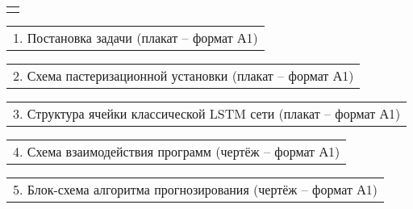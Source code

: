 \documentclass[12pt, А4, twoside]{article}
\begin{document}
\begin{FlushLeft}
    \begin{tabular}{p{17.25cm}}
        \vspace{0pt} \hline \\
    \end{tabular}

    \vspace{-0.1 cm}

    \begin{tabular}{p{17.25cm}}
        \hspace{0.3cm} \textsf{1. Постановка задачи (плакат {--} формат А1)} \vspace{0pt} \hline  \\
    \end{tabular}

    \vspace{-0.1 cm}

    \begin{tabular}{p{17.25cm}}
        \hspace{0.3cm} \textsf{2. Схема пастеризационной установки (плакат {--} формат А1)} \vspace{0pt} \hline  \\
    \end{tabular}

    \vspace{-0.1 cm}

    \begin{tabular}{p{17.25cm}}
        \hspace{0.3cm} \textsf{3. Структура ячейки классической LSTM сети (плакат {--} формат А1)} \vspace{0pt} \hline  \\
    \end{tabular}

    \vspace{-0.1 cm}

    \begin{tabular}{p{17.25cm}}
        \hspace{0.3cm} \textsf{4. Схема взаимодействия программ (чертёж {--} формат А1)} \vspace{0pt} \hline  \\
    \end{tabular}

    \vspace{-0.1 cm}

    \begin{tabular}{p{17.25cm}}
        \hspace{0.3cm} \textsf{5. Блок-схема алгоритма прогнозирования (чертёж {--} формат А1)} \vspace{0pt} \hline  \\
    \end{tabular}


\end{FlushLeft}
\end{document}
